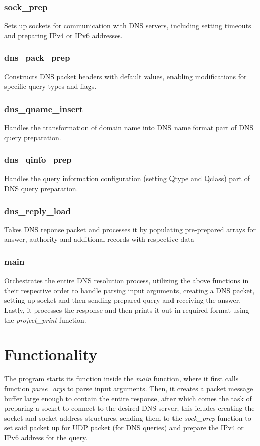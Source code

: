 \documentclass[a4paper, 11pt]{article}
\begin{document}
	\subsubsection{sock\_prep}
	\noindent Sets up sockets for communication with DNS servers, including setting timeouts and preparing IPv4 or IPv6 addresses.
	\subsubsection{dns\_pack\_prep}
	\noindent Constructs DNS packet headers with default values, enabling modifications for specific query types and flags.
	\subsubsection{dns\_qname\_insert}
	\noindent Handles the transformation of domain name into DNS name format part of DNS query preparation.
	\subsubsection{dns\_qinfo\_prep}
	\noindent Handles the query information configuration (setting Qtype and Qclass) part of DNS query preparation.
	\subsubsection{dns\_reply\_load}
	\noindent Takes DNS reponse packet and processes it by populating pre-prepared arrays for answer, authority and 
	additional records with respective data
	\subsubsection{main}
	\noindent Orchestrates the entire DNS resolution process, utilizing the above functions in their respective order to 
	handle parsing input arguments, creating a DNS packet, setting up socket and then sending prepared query 
	and receiving the answer. Lastly, it processes the response and then prints it out in required format 
	using the \textit{project\_print} function.


	\newpage
	\section{Functionality}
	The program starts its function inside the \textit{main} function, where it first calls function 
	\textit{parse\_args} to parse input arguments. Then, it creates a packet message buffer 
	large enough to contain the entire response, after which comes the task of preparing a 
	socket to connect to the desired DNS server; this icludes creating the socket and socket address 
	structures, sending them to the \textit{sock\_prep} function to set said packet up for UDP packet 
	(for DNS queries) and prepare the IPv4 or IPv6 address for the query.
\end{document}
